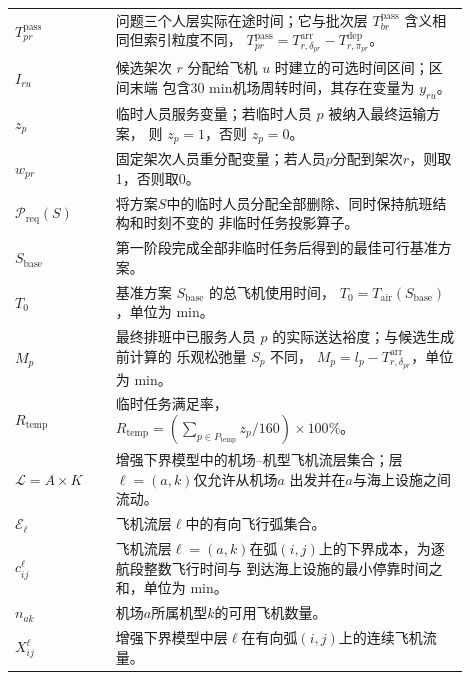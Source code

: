 \documentclass[UTF8,a4paper,zihao=5]{ctexart}
\begin{document}
\begin{longtable}{
    >{\centering\arraybackslash}p{0.20\linewidth}
    p{0.70\linewidth}
}
$T_{pr}^{\mathrm{pass}}$
& 问题三个人层实际在途时间；它与批次层
$T_{br}^{\mathrm{pass}}$ 含义相同但索引粒度不同，
$T_{pr}^{\mathrm{pass}}=
T_{r,\delta_{pr}}^{\mathrm{arr}}-T_{r,\pi_{pr}}^{\mathrm{dep}}$。 \\

$I_{ru}$
& 候选架次 $r$ 分配给飞机 $u$ 时建立的可选时间区间；区间末端
包含30 min机场周转时间，其存在变量为 $y_{ru}$。 \\

$z_p$
& 临时人员服务变量；若临时人员 $p$ 被纳入最终运输方案，
则 $z_p=1$，否则 $z_p=0$。 \\

$w_{pr}$
& 固定架次人员重分配变量；若人员$p$分配到架次$r$，则取1，否则取0。 \\

$\mathcal{P}_{\mathrm{req}}(S)$
& 将方案$S$中的临时人员分配全部删除、同时保持航班结构和时刻不变的
非临时任务投影算子。 \\

$S_{\mathrm{base}}$
& 第一阶段完成全部非临时任务后得到的最佳可行基准方案。 \\

$T_0$
& 基准方案 $S_{\mathrm{base}}$ 的总飞机使用时间，
$T_0=T_{\mathrm{air}}(S_{\mathrm{base}})$，单位为 min。 \\

$M_p$
& 最终排班中已服务人员 $p$ 的实际送达裕度；与候选生成前计算的
乐观松弛量 $S_p$ 不同，
$M_p=l_p-T_{r,\delta_{pr}}^{\mathrm{arr}}$，单位为 min。 \\

$R_{\mathrm{temp}}$
& 临时任务满足率，
$R_{\mathrm{temp}}=
\left(\sum_{p\in P_{\mathrm{temp}}}z_p/160\right)\times100\%$。 \\

$\mathcal{L}=A\times K$
& 增强下界模型中的机场--机型飞机流层集合；层$\ell=(a,k)$仅允许从机场$a$
出发并在$a$与海上设施之间流动。 \\

$\mathcal{E}_{\ell}$
& 飞机流层$\ell$中的有向飞行弧集合。 \\

$c_{ij}^{\ell}$
& 飞机流层$\ell=(a,k)$在弧$(i,j)$上的下界成本，为逐航段整数飞行时间与
到达海上设施的最小停靠时间之和，单位为 min。 \\

$n_{ak}$
& 机场$a$所属机型$k$的可用飞机数量。 \\

$X_{ij}^{\ell}$
& 增强下界模型中层$\ell$在有向弧$(i,j)$上的连续飞机流量。 \\


\end{longtable}
\end{document}
